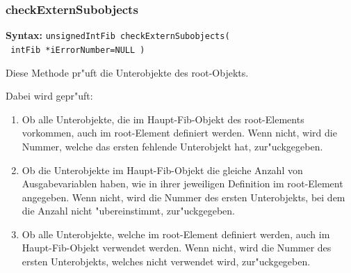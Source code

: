 % 
% 
% 
% 
% 
% 
% 
% 

\subsubsection{checkExternSubobjects}

\textbf{Syntax:} \verb|unsignedIntFib checkExternSubobjects(| \\\verb| intFib *iErrorNumber=NULL )|

\bigskip\noindent
Diese Methode pr"uft die Unterobjekte des root-Objekts.

\bigskip\noindent
Dabei wird gepr"uft:
\begin{enumerate}
 \item Ob alle Unterobjekte, die im Haupt-Fib-Objekt des root-Elements vorkommen, auch im root-Element definiert werden. Wenn nicht, wird die Nummer, welche das ersten fehlende Unterobjekt hat, zur"uckgegeben.
 \item Ob die Unterobjekte im Haupt-Fib-Objekt die gleiche Anzahl von Ausgabevariablen haben, wie in ihrer jeweiligen Definition im root-Element angegeben. Wenn nicht, wird die Nummer des ersten Unterobjekts, bei dem die Anzahl nicht "ubereinstimmt, zur"uckgegeben.
 \item Ob alle Unterobjekte, welche im root-Element definiert werden, auch im Haupt-Fib-Objekt verwendet werden. Wenn nicht, wird die Nummer des ersten Unterobjekts, welches nicht verwendet wird, zur"uckgegeben.
\end{enumerate}

